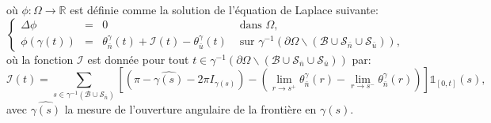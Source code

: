 où $\phi:\Omega\longrightarrow\mathbb{R}$ est définie comme la solution de l'équation de Laplace suivante:
\begin{equation}
\left\{
\begin{array}{lcll}
\Delta\phi &=& 0 &\mbox{ dans }\Omega,\\[0.5cm]
\phi(\gamma(t))&=&\theta_{\bar{n}}^\gamma(t)+\mathcal{I}(t)-\theta_{\bar{u}}^\gamma(t)& \mbox{ sur } \gamma^{-1}(\partial\Omega\backslash(\mathcal{B}\cup\mathcal{S}_{\bar{n}}\cup\mathcal{S}_{\bar{u}})),
\end{array}
\right.
\label{eqn:principe_def_phi}
\end{equation}
où la fonction $\mathcal{I}$ est donnée pour tout $t\in\gamma^{-1}(\partial\Omega\backslash(\mathcal{B}\cup\mathcal{S}_{\bar{n}}\cup\mathcal{S}_{\bar{u}}))$ par:
$$
\mathcal{I}(t)=\sum_{s\in\gamma^{-1}(\mathcal{B}\cup\mathcal{S}_{\bar{n}})}\left[\left(\pi-\widehat{\gamma(s)}-2\pi I_{\gamma(s)}\right)-\left(\lim\limits_{r\rightarrow s^+}\theta^{\gamma}_{\bar{n}}(r) - \lim\limits_{r\rightarrow s^-}\theta^{\gamma}_{\bar{n}}(r)\right)\right]\mathbb{1}_{[0, t]}(s),
$$
avec $\widehat{\gamma(s)}$ la mesure de l'ouverture angulaire de la frontière en $\gamma(s)$.

